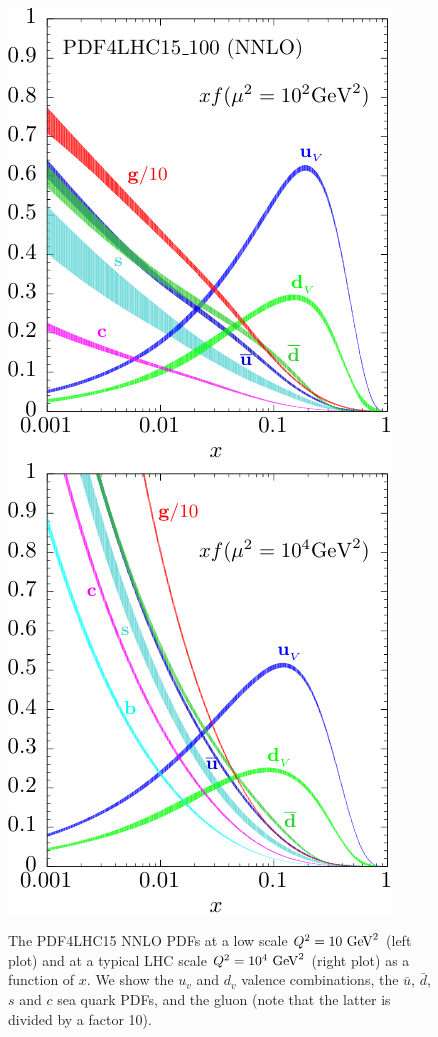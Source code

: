 \begin{figure}[t]
\begin{center}
  \includegraphics[scale=1.2]{plots/pdf4lhcq10.pdf}
  \includegraphics[scale=1.2]{plots/pdf4lhcq1000.pdf}
  \caption{\small The PDF4LHC15 NNLO PDFs at a low scale
    $Q^2=10~{\rm GeV}^2$ (left plot) and at a typical LHC scale
    $Q^2=10^4~{\rm GeV}^2$ (right plot) as a function of $x$.
    We show the $u_v$ and $d_v$ valence combinations, the $\bar{u}$,
    $\bar{d}$, $s$ and $c$ sea quark PDFs, and the gluon (note that
    the latter is divided by a factor 10).
    \label{fig:nnlopdfs}
  }
\end{center}
\end{figure}

